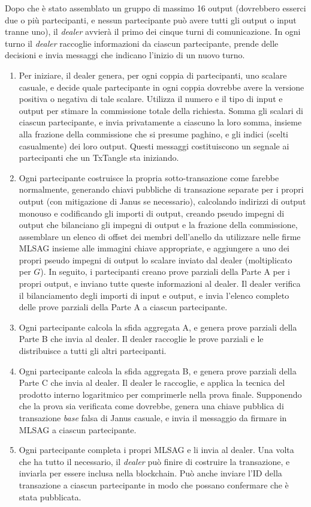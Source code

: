 Dopo che è stato assemblato un gruppo di massimo 16 output (dovrebbero esserci due o più partecipanti, e nessun partecipante può avere tutti gli output o input tranne uno), il \emph{dealer} avvierà il primo dei cinque turni di comunicazione. In ogni turno il \emph{dealer} raccoglie informazioni da ciascun partecipante, prende delle decisioni e invia messaggi che indicano l'inizio di un nuovo turno.
\begin{enumerate}
    \item Per iniziare, il dealer genera, per ogni coppia di partecipanti, uno scalare casuale, e decide quale partecipante in ogni coppia dovrebbe avere la versione positiva o negativa di tale scalare. Utilizza il numero e il tipo di input e output per stimare la commissione totale della richiesta. Somma gli scalari di ciascun partecipante, e invia privatamente a ciascuno la loro somma, insieme alla frazione della commissione che si presume paghino, e gli indici (scelti casualmente) dei loro output. Questi messaggi costituiscono un segnale ai partecipanti che un TxTangle sta iniziando.
    \item Ogni partecipante costruisce la propria sotto-transazione come farebbe normalmente, generando chiavi pubbliche di transazione separate per i propri output (con mitigazione di Janus se necessario), calcolando indirizzi di output monouso e codificando gli importi di output, creando pseudo impegni di output che bilanciano gli impegni di output e la frazione della commissione, assemblare un elenco di offset dei membri dell'anello da utilizzare nelle firme MLSAG insieme alle immagini chiave appropriate, e aggiungere a uno dei propri pseudo impegni di output lo scalare inviato dal dealer (moltiplicato per $G$). In seguito, i partecipanti creano prove parziali della Parte A per i propri output, e inviano tutte queste informazioni al dealer. Il dealer verifica il bilanciamento degli importi di input e output, e invia l'elenco completo delle prove parziali della Parte A a ciascun partecipante.
    \item Ogni partecipante calcola la sfida aggregata A, e genera prove parziali della Parte B che invia al dealer. Il dealer raccoglie le prove parziali e le distribuisce a tutti gli altri partecipanti.
    \item Ogni partecipante calcola la sfida aggregata B, e genera prove parziali della Parte C che invia al dealer. Il dealer le raccoglie, e applica la tecnica del prodotto interno logaritmico per comprimerle nella prova finale. Supponendo che la prova sia verificata come dovrebbe, genera una chiave pubblica di transazione \emph{base} falsa di Janus casuale, e invia il messaggio da firmare in MLSAG a ciascun partecipante.
    \item Ogni partecipante completa i propri MLSAG e li invia al dealer. Una volta che ha tutto il necessario, il \emph{dealer} può finire di costruire la transazione, e inviarla per essere inclusa nella blockchain. Può anche inviare l'ID della transazione a ciascun partecipante in modo che possano confermare che è stata pubblicata.
\end{enumerate}{}
